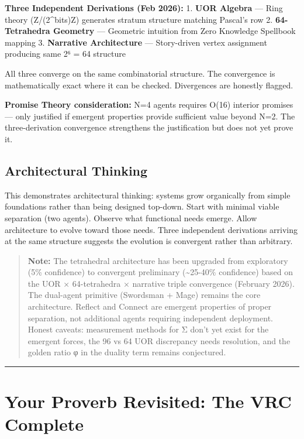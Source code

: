 \documentclass[
  11pt,
]{article}
\begin{document}
\textbf{Three Independent Derivations (Feb 2026):} 1. \textbf{UOR
Algebra} --- Ring theory (Z/(2\^{}bits)Z) generates stratum structure
matching Pascal's row 2. \textbf{64-Tetrahedra Geometry} --- Geometric
intuition from Zero Knowledge Spellbook mapping 3. \textbf{Narrative
Architecture} --- Story-driven vertex assignment producing same 2⁶ = 64
structure

All three converge on the same combinatorial structure. The convergence
is mathematically exact where it can be checked. Divergences are
honestly flagged.

\textbf{Promise Theory consideration:} N=4 agents requires O(16)
interior promises --- only justified if emergent properties provide
sufficient value beyond N=2. The three-derivation convergence
strengthens the justification but does not yet prove it.

\subsection{Architectural Thinking}\label{architectural-thinking}

This demonstrates architectural thinking: systems grow organically from
simple foundations rather than being designed top-down. Start with
minimal viable separation (two agents). Observe what functional needs
emerge. Allow architecture to evolve toward those needs. Three
independent derivations arriving at the same structure suggests the
evolution is convergent rather than arbitrary.

\begin{quote}
\textbf{Note:} The tetrahedral architecture has been upgraded from
exploratory (5\% confidence) to convergent preliminary
(\textasciitilde25-40\% confidence) based on the UOR × 64-tetrahedra ×
narrative triple convergence (February 2026). The dual-agent primitive
(Swordsman + Mage) remains the core architecture. Reflect and Connect
are emergent properties of proper separation, not additional agents
requiring independent deployment. Honest caveats: measurement methods
for Σ don't yet exist for the emergent forces, the 96 vs 64 UOR
discrepancy needs resolution, and the golden ratio φ in the duality term
remains conjectured.
\end{quote}

\begin{center}\rule{0.5\linewidth}{0.5pt}\end{center}

\section{Your Proverb Revisited: The VRC
Complete}\label{your-proverb-revisited-the-vrc-complete}
\end{document}
